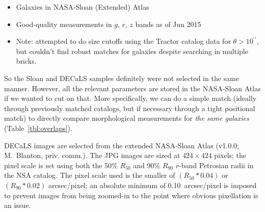 \documentclass[iop,apj,tighten]{emulateapj}
\begin{document}
\begin{itemize}
    \item Galaxies in NASA-Sloan (Extended) Atlas
    \item Good-quality measurements in $g$, $r$, $z$ bands as of Jun 2015
    \item Note: attempted to do size cutoffs using the Tractor catalog data for $\theta > 10^{\prime\prime}$, but couldn't find robust matches for galaxies despite searching in multiple bricks.
\end{itemize}

So the Sloan and DECaLS samples definitely were not selected in the same manner. However, all the relevant parameters are stored in the NASA-Sloan Atlas if we wanted to cut on that. More specifically, we can do a simple match (ideally through previously matched catalogs, but if necessary through a tight positional match) to directly compare morphological measurements for \emph{the same galaxies} (Table~\ref{tbl:overlaps}).

DECaLS images are selected from the extended NASA-Sloan Atlas (v1.0.0; M.~Blanton, priv. comm.). The JPG images are sized at $424\times424$ pixels; the pixel scale is set using both the 50\% $R_{50}$ and 90\% $R_{90}$ $r$-band Petrosian radii in the NSA catalog. The pixel scale used is the smaller of $(R_{50}*0.04)$ or $(R_{90}*0.02)$ arcsec/pixel; an absolute minimum of 0.10~arcsec/pixel is imposed to prevent images from being zoomed-in to the point where obvious pixellation is an issue.




\end{document}
